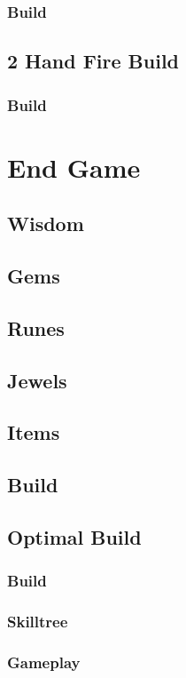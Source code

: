 \documentclass[12pt]{article}
\begin{document}
\subsubsection{Build}
\subsection{2 Hand Fire Build}
\subsubsection{Build}

\newpage


\section{End Game}
\subsection{Wisdom}
\subsection{Gems}
\subsection{Runes}
\subsection{Jewels}
\subsection{Items}
\subsection{Build}
\subsection{Optimal Build}
\subsubsection{Build}
\subsubsection{Skilltree}
\subsubsection{Gameplay}
\end{document}
